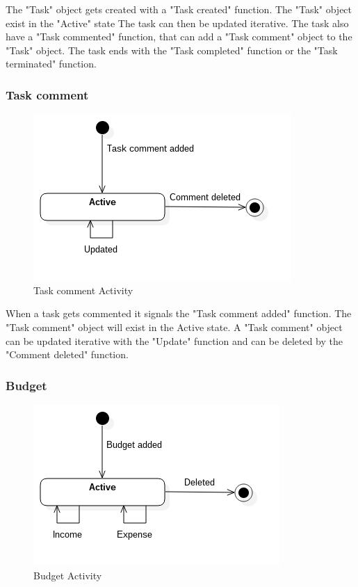 The "Task" object gets created with a "Task created" function. The "Task" object exist in the "Active" state The task can then be updated iterative. The task also have a "Task commented" function, that can add a "Task comment" object to the "Task" object. The task ends with the "Task completed" function or the "Task terminated" function.

\subsubsection*{Task comment}

\begin{figure}[H]
    \centering
    \includegraphics[scale=0.6]{Images/ProblemDomain/tcActivityDiagram.png}
    \caption{Task comment Activity}
    \label{fig:tcActivityDiagram}
\end{figure}

When a task gets commented it signals the "Task comment added" function. The "Task comment" object will exist in the Active state. A "Task comment" object can be updated iterative with the "Update" function and can be deleted by the "Comment deleted" function.

\subsubsection*{Budget}

\begin{figure}[H]
    \centering
    \includegraphics[scale=0.6]{Images/ProblemDomain/budgetActivityDiagram.png}
    \caption{Budget Activity}
    \label{fig:budgetActivityDiagram}
\end{figure}

